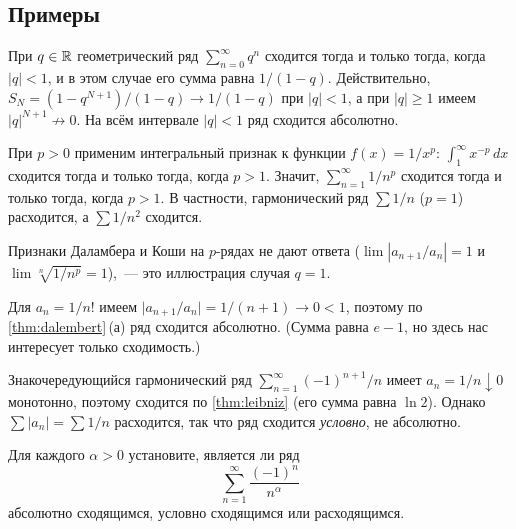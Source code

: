 \subsection*{Примеры}

\begin{example}
\label{ex:geometric}
При $q \in \mathbb{R}$ геометрический ряд $\sum_{n=0}^{\infty} q^n$ сходится
тогда и только тогда, когда $|q| < 1$, и в этом случае его сумма
равна $1/(1 - q)$. Действительно,
$S_N = (1 - q^{N+1})/(1 - q) \to 1/(1 - q)$ при $|q| < 1$, а при
$|q| \ge 1$ имеем $|q|^{N+1} \not\to 0$. На всём интервале $|q| < 1$
ряд сходится абсолютно.
\end{example}

\begin{example}
\label{ex:p-series}
При $p > 0$ применим интегральный признак к функции $f(x) = 1/x^p$:
$\int_1^{\infty} x^{-p}\, dx$ сходится тогда и только тогда, когда
$p > 1$. Значит, $\sum_{n=1}^{\infty} 1/n^p$ сходится тогда и только
тогда, когда $p > 1$. В частности, гармонический ряд $\sum 1/n$
($p = 1$) расходится, а $\sum 1/n^2$ сходится.

Признаки Даламбера и Коши на $p$-рядах не дают ответа
($\lim |a_{n+1}/a_n| = 1$ и $\lim \sqrt[n]{1/n^p} = 1$),~--- это
иллюстрация случая $q = 1$.
\end{example}

\begin{example}
\label{ex:factorial-series}
Для $a_n = 1/n!$ имеем
$\bigl|a_{n+1}/a_n\bigr| = 1/(n+1) \to 0 < 1$, поэтому по
\cref{thm:dalembert}\,(а) ряд сходится абсолютно. (Сумма равна
$e - 1$, но здесь нас интересует только сходимость.)
\end{example}

\begin{example}
\label{ex:alt-harmonic}
Знакочередующийся гармонический ряд
$\sum_{n=1}^{\infty} (-1)^{n+1}/n$ имеет $a_n = 1/n \downarrow 0$
монотонно, поэтому сходится по \cref{thm:leibniz} (его сумма равна
$\ln 2$). Однако $\sum |a_n| = \sum 1/n$ расходится, так что ряд
сходится \emph{условно}, не абсолютно.
\end{example}

\begin{problem}
\label{prob:series-classify}
Для каждого $\alpha > 0$ установите, является ли ряд
\[
  \sum_{n=1}^{\infty} \frac{(-1)^n}{n^{\alpha}}
\]
абсолютно сходящимся, условно сходящимся или расходящимся.
\end{problem}

